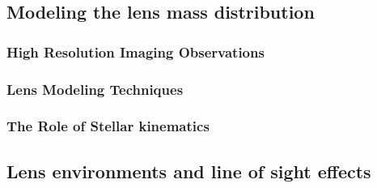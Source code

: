 



\subsection{Modeling the lens mass distribution}
\label{sec:lensmodel}



\subsubsection{High Resolution Imaging Observations}





\subsubsection{Lens Modeling Techniques}




\subsubsection{The Role of Stellar kinematics}



\subsection{Lens environments and line of sight effects}
\label{sec:los}




